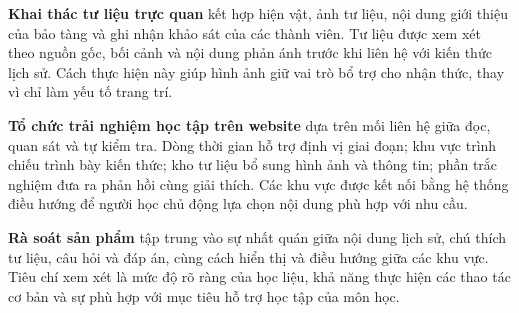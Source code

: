\textbf{Khai thác tư liệu trực quan} kết hợp hiện vật, ảnh tư liệu, nội dung giới thiệu của bảo tàng và ghi nhận khảo sát của các thành viên. Tư liệu được xem xét theo nguồn gốc, bối cảnh và nội dung phản ánh trước khi liên hệ với kiến thức lịch sử. Cách thực hiện này giúp hình ảnh giữ vai trò bổ trợ cho nhận thức, thay vì chỉ làm yếu tố trang trí.

\textbf{Tổ chức trải nghiệm học tập trên website} dựa trên mối liên hệ giữa đọc, quan sát và tự kiểm tra. Dòng thời gian hỗ trợ định vị giai đoạn; khu vực trình chiếu trình bày kiến thức; kho tư liệu bổ sung hình ảnh và thông tin; phần trắc nghiệm đưa ra phản hồi cùng giải thích. Các khu vực được kết nối bằng hệ thống điều hướng để người học chủ động lựa chọn nội dung phù hợp với nhu cầu.

\textbf{Rà soát sản phẩm} tập trung vào sự nhất quán giữa nội dung lịch sử, chú thích tư liệu, câu hỏi và đáp án, cùng cách hiển thị và điều hướng giữa các khu vực. Tiêu chí xem xét là mức độ rõ ràng của học liệu, khả năng thực hiện các thao tác cơ bản và sự phù hợp với mục tiêu hỗ trợ học tập của môn học.

\clearpage
